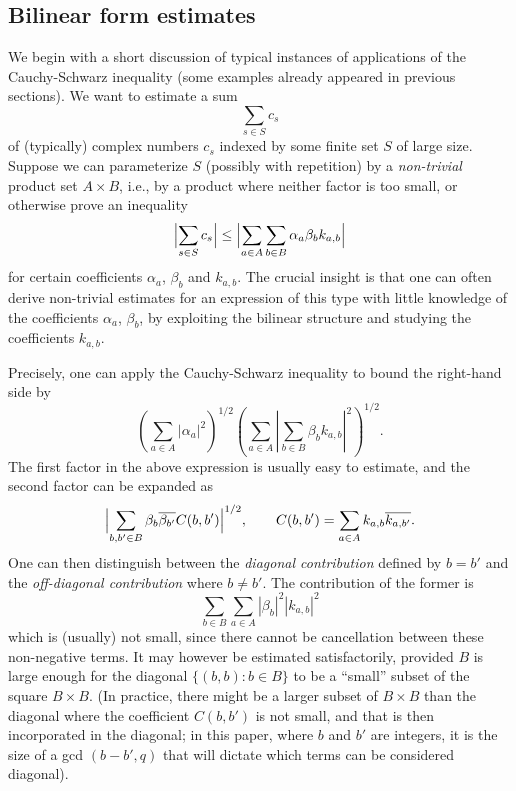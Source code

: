 \documentclass[12pt,a4paper,reqno]{amsart}
\numberwithin{equation}{section}
\theoremstyle{plain}
\theoremstyle{definition}
\begin{document}
\subsection{Bilinear form estimates}

We begin with a short discussion of typical instances of applications
of the Cauchy-Schwarz inequality (some examples already appeared in
previous sections).  We want to estimate a sum
$$
\sum_{s  \in S} c_s
$$
of (typically) complex numbers $c_s$ indexed by some finite set $S$ of
large size. Suppose we can parameterize $S$ (possibly with repetition)
by a \emph{non-trivial} product set $A \times B$, i.e., by a product
where neither factor is too small, or otherwise prove an inequality
$$ 
\Bigl|\sum_{s \in S} c_s\Bigr| \leq \Bigl|\sum_{a \in A} \sum_{b \in
  B} \alpha_a \beta_b k_{a,b}\Bigr|
$$ 
for certain coefficients $\alpha_a$, $\beta_b$ and $k_{a,b}$.  The
crucial insight is that one can often derive non-trivial estimates for
an expression of this type with little knowledge of the coefficients
$\alpha_a$, $\beta_b$, by exploiting the bilinear structure and
studying the coefficients $k_{a,b}$. 
\par
Precisely, one can apply the Cauchy-Schwarz inequality to bound the right-hand side by
$$ 
\left(\sum_{a \in A} |\alpha_a|^2\right)^{1/2} \left(\sum_{a \in A}
  \left|\sum_{b\in B} \beta_bk_{a,b}\right|^2\right)^{1/2}.
$$ 
The first factor in the above expression is usually easy to
estimate, and the second factor can be expanded as
$$
\Bigl|\sum_{b,b'\in B}\beta_b\overline{\beta_{b'}}
C(b,b')\Bigr|^{1/2}, \quad\quad C(b,b')=\sum_{a\in
  A}k_{a,b}\overline{k_{a,b'}}.
$$ 
One can then distinguish between the \emph{diagonal contribution}
defined by $b=b'$ and the \emph{off-diagonal contribution} where $b
\neq b'$.  The contribution of the former is
$$
\sum_{b\in B}\sum_{a\in A}|\beta_b|^2|k_{a,b}|^2
$$
which is (usually) not small, since there cannot be cancellation
between these non-negative terms. It may however be estimated
satisfactorily, provided $B$ is large enough for the diagonal $\{
(b,b): b\in B \}$ to be a ``small'' subset of the square $B \times
B$. (In practice, there might be a larger subset of $B\times B$ than
the diagonal where the coefficient $C(b,b')$ is not small, and that is
then incorporated in the diagonal; in this paper, where $b$ and $b'$
are integers, it is the size of a gcd $(b-b',q)$ that will dictate
which terms can be considered diagonal).
\end{document}
